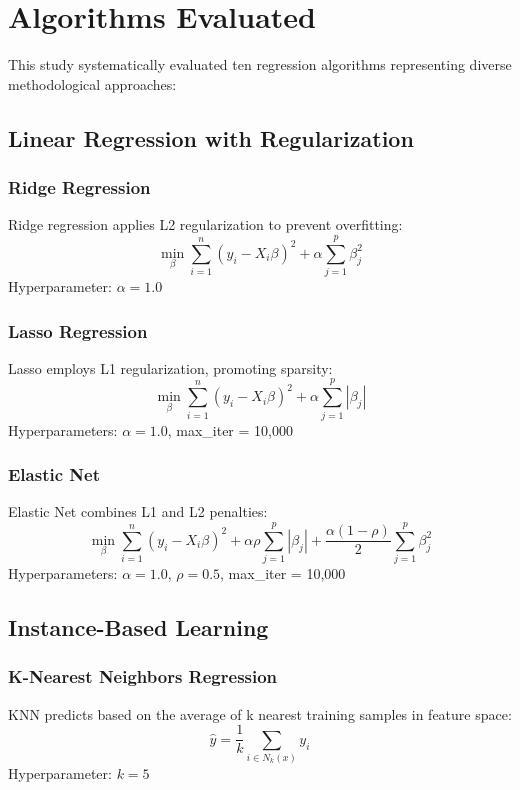 \section{Algorithms Evaluated}

This study systematically evaluated ten regression algorithms representing diverse methodological approaches:

\subsection{Linear Regression with Regularization}

\subsubsection{Ridge Regression}
Ridge regression applies L2 regularization to prevent overfitting:
\begin{equation}
    \min_{\beta} \sum_{i=1}^{n}(y_i - X_i\beta)^2 + \alpha\sum_{j=1}^{p}\beta_j^2
\end{equation}
Hyperparameter: $\alpha = 1.0$

\subsubsection{Lasso Regression}
Lasso employs L1 regularization, promoting sparsity:
\begin{equation}
    \min_{\beta} \sum_{i=1}^{n}(y_i - X_i\beta)^2 + \alpha\sum_{j=1}^{p}|\beta_j|
\end{equation}
Hyperparameters: $\alpha = 1.0$, max\_iter = 10,000

\subsubsection{Elastic Net}
Elastic Net combines L1 and L2 penalties:
\begin{equation}
    \min_{\beta} \sum_{i=1}^{n}(y_i - X_i\beta)^2 + \alpha\rho\sum_{j=1}^{p}|\beta_j| + \frac{\alpha(1-\rho)}{2}\sum_{j=1}^{p}\beta_j^2
\end{equation}
Hyperparameters: $\alpha = 1.0$, $\rho = 0.5$, max\_iter = 10,000

\subsection{Instance-Based Learning}

\subsubsection{K-Nearest Neighbors Regression}
KNN predicts based on the average of k nearest training samples in feature space:
\begin{equation}
    \hat{y} = \frac{1}{k}\sum_{i \in N_k(x)} y_i
\end{equation}
Hyperparameter: $k = 5$

